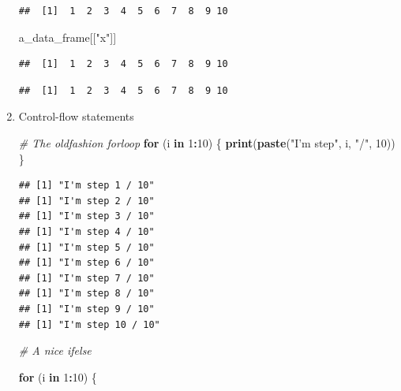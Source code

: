\documentclass[]{book}
\newenvironment{Shaded}{\begin{snugshade}}{\end{snugshade}}
\newcommand{\CommentTok}[1]{\textcolor[rgb]{0.56,0.35,0.01}{\textit{#1}}}
\newcommand{\ControlFlowTok}[1]{\textcolor[rgb]{0.13,0.29,0.53}{\textbf{#1}}}
\newcommand{\DecValTok}[1]{\textcolor[rgb]{0.00,0.00,0.81}{#1}}
\newcommand{\KeywordTok}[1]{\textcolor[rgb]{0.13,0.29,0.53}{\textbf{#1}}}
\newcommand{\NormalTok}[1]{#1}
\newcommand{\OperatorTok}[1]{\textcolor[rgb]{0.81,0.36,0.00}{\textbf{#1}}}
\newcommand{\StringTok}[1]{\textcolor[rgb]{0.31,0.60,0.02}{#1}}
\begin{document}
\begin{enumerate}
\begin{verbatim}
##  [1]  1  2  3  4  5  6  7  8  9 10
\end{verbatim}

\begin{Shaded}
\begin{Highlighting}[]
\NormalTok{a_data_frame[[}\StringTok{"x"}\NormalTok{]]}
\end{Highlighting}
\end{Shaded}

\begin{verbatim}
##  [1]  1  2  3  4  5  6  7  8  9 10
\end{verbatim}

\begin{Shaded}
\end{Shaded}

\begin{verbatim}
##  [1]  1  2  3  4  5  6  7  8  9 10
\end{verbatim}
\item
  Control-flow statements

\begin{Shaded}
\begin{Highlighting}[]
\CommentTok{# The oldfashion forloop}
\ControlFlowTok{for}\NormalTok{ (i }\ControlFlowTok{in} \DecValTok{1}\OperatorTok{:}\DecValTok{10}\NormalTok{) \{}
  \KeywordTok{print}\NormalTok{(}\KeywordTok{paste}\NormalTok{(}\StringTok{"I'm step"}\NormalTok{, i, }\StringTok{"/"}\NormalTok{, }\DecValTok{10}\NormalTok{))}
\NormalTok{\}}
\end{Highlighting}
\end{Shaded}

\begin{verbatim}
## [1] "I'm step 1 / 10"
## [1] "I'm step 2 / 10"
## [1] "I'm step 3 / 10"
## [1] "I'm step 4 / 10"
## [1] "I'm step 5 / 10"
## [1] "I'm step 6 / 10"
## [1] "I'm step 7 / 10"
## [1] "I'm step 8 / 10"
## [1] "I'm step 9 / 10"
## [1] "I'm step 10 / 10"
\end{verbatim}

\begin{Shaded}
\begin{Highlighting}[]
\CommentTok{# A nice ifelse}

\ControlFlowTok{for}\NormalTok{ (i }\ControlFlowTok{in} \DecValTok{1}\OperatorTok{:}\DecValTok{10}\NormalTok{) \{}


\end{Highlighting}
\end{Shaded}
\end{enumerate}
\end{document}
